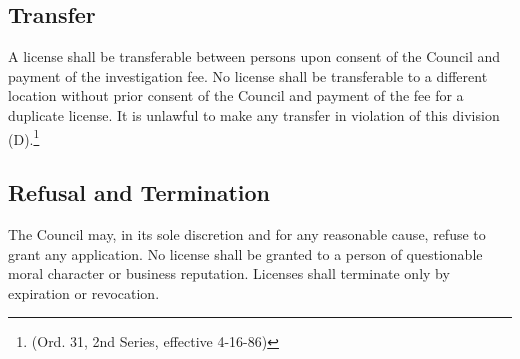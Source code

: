 \subsection{Transfer}
A license shall be transferable between persons upon consent of the Council and payment of the investigation fee.  No license shall be transferable to a different location without prior consent of the Council and payment of the fee for a duplicate license.  It is unlawful to make any transfer in violation of this division (D).\footnote{(Ord. 31, 2nd Series, effective 4-16-86)}
\subsection{Refusal and Termination}
The Council may, in its sole discretion and for any reasonable cause, refuse to grant any application.  No license shall be granted to a person of questionable moral character or business reputation.  Licenses shall terminate only by expiration or revocation.
